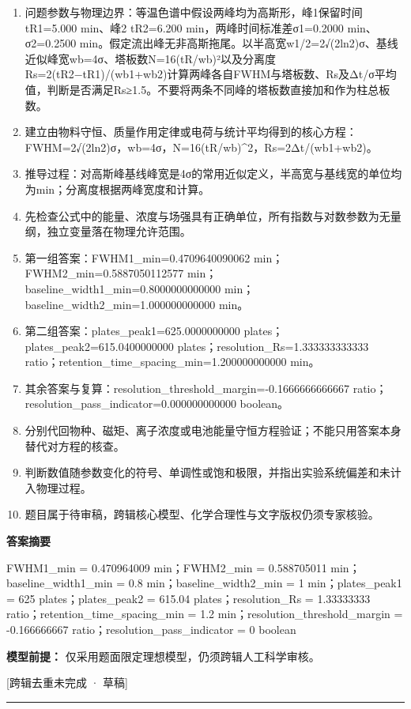 \documentclass[UTF8,11pt,a4paper]{ctexart}
\begin{document}
\begin{enumerate}
\item 问题参数与物理边界：等温色谱中假设两峰均为高斯形，峰1保留时间tR1=5.000 min、峰2 tR2=6.200 min，两峰时间标准差σ1=0.2000 min、σ2=0.2500 min。假定流出峰无非高斯拖尾。以半高宽w1/2=2√(2ln2)σ、基线近似峰宽wb=4σ、塔板数N=16(tR/wb)²以及分离度Rs=2(tR2−tR1)/(wb1+wb2)计算两峰各自FWHM与塔板数、Rs及Δt/σ平均值，判断是否满足Rs≥1.5。不要将两条不同峰的塔板数直接加和作为柱总板数。
\item 建立由物料守恒、质量作用定律或电荷与统计平均得到的核心方程：FWHM=2√(2ln2)σ，wb=4σ，N=16(tR/wb)\textasciicircum{}2，Rs=2Δt/(wb1+wb2)。
\item 推导过程：对高斯峰基线峰宽是4σ的常用近似定义，半高宽与基线宽的单位均为min；分离度根据两峰宽度和计算。
\item 先检查公式中的能量、浓度与场强具有正确单位，所有指数与对数参数为无量纲，独立变量落在物理允许范围。
\item 第一组答案：FWHM1\_min=0.4709640090062 min；FWHM2\_min=0.5887050112577 min；baseline\_width1\_min=0.8000000000000 min；baseline\_width2\_min=1.000000000000 min。
\item 第二组答案：plates\_peak1=625.0000000000 plates；plates\_peak2=615.0400000000 plates；resolution\_Rs=1.333333333333 ratio；retention\_time\_spacing\_min=1.200000000000 min。
\item 其余答案与复算：resolution\_threshold\_margin=-0.1666666666667 ratio；resolution\_pass\_indicator=0.000000000000 boolean。
\item 分别代回物种、磁矩、离子浓度或电池能量守恒方程验证；不能只用答案本身替代对方程的核查。
\item 判断数值随参数变化的符号、单调性或饱和极限，并指出实验系统偏差和未计入物理过程。
\item 题目属于待审稿，跨辑核心模型、化学合理性与文字版权仍须专家核验。
\end{enumerate}
\noindent\textbf{答案摘要}\par
FWHM1\_min = 0.470964009 min；FWHM2\_min = 0.588705011 min；baseline\_width1\_min = 0.8 min；baseline\_width2\_min = 1 min；plates\_peak1 = 625 plates；plates\_peak2 = 615.04 plates；resolution\_Rs = 1.33333333 ratio；retention\_time\_spacing\_min = 1.2 min；resolution\_threshold\_margin = -0.166666667 ratio；resolution\_pass\_indicator = 0 boolean\par
\noindent\textbf{模型前提：}
仅采用题面限定理想模型，仍须跨辑人工科学审核。\par
\noindent\textcolor{red!65!black}{[跨辑去重未完成 · 草稿]} \par
\medskip\hrule\medskip
{}
\end{document}
